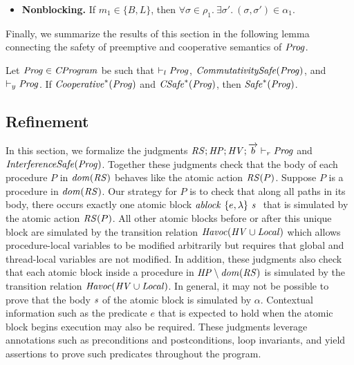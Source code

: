 \begin{itemize}
\item {\bf Nonblocking.}
If $m_1 \in \{B, L\}$, then
$\forall \sigma \in \rho_1.\ \exists \sigma'.\ (\sigma, \sigma') \in \alpha_1$.
\end{itemize}

Finally, we summarize the results of this section in the following lemma connecting the safety
of preemptive and cooperative semantics of $\mathit{Prog}$.
\begin{lemma}
Let $\mathit{Prog} \in \mathit{CProgram}$ be such that $\vdash_l \mathit{Prog}$, $\mathit{CommutativitySafe}(\mathit{Prog})$, and $\vdash_y \mathit{Prog}$.
If $\mathit{Cooperative}^*(\mathit{Prog})$ and $\mathit{CSafe}^*(\mathit{Prog})$, then $\mathit{Safe}^*(\mathit{Prog})$.
\end{lemma}

\subsection{Refinement}
\label{sec:refinement}

In this section, we formalize the judgments $\mathit{RS};\mathit{HP};\mathit{HV};\overrightarrow{b} \vdash_r \mathit{Prog}$ and $\mathit{InterferenceSafe}(\mathit{Prog})$.
Together these judgments check that the body of each procedure $P$ in $\mathit{dom}(\mathit{RS})$ behaves like the atomic action $\mathit{RS}(P)$.
Suppose $P$ is a procedure in $\mathit{dom}(\mathit{RS})$.
Our strategy for $P$ is to check that along all paths in its body, there occurs exactly one atomic block 
$\mathit{ablock}\ {\{e,\lambda\}}\ {\mathit{s}}\ $ that is simulated by the atomic action $\mathit{RS}(P)$.
All other atomic blocks before or after this unique block are simulated by the transition relation $\mathit{Havoc}(\mathit{HV} \cup \mathit{Local})$ 
which allows procedure-local variables to be modified arbitrarily but requires that global and thread-local variables are not modified.
In addition, these judgments also check that each atomic block inside a procedure in $\mathit{HP} \setminus \mathit{dom}(\mathit{RS})$ 
is simulated by the transition relation $\mathit{Havoc}(\mathit{HV} \cup \mathit{Local})$.
In general, it may not be possible to prove that the body $\mathit{s}$ of the atomic block is simulated by $\alpha$.
Contextual information such as the predicate $e$ that is expected to hold when the atomic block begins execution may also be required.
These judgments leverage annotations such as preconditions and postconditions, loop invariants, and yield assertions to prove 
such predicates throughout the program.

